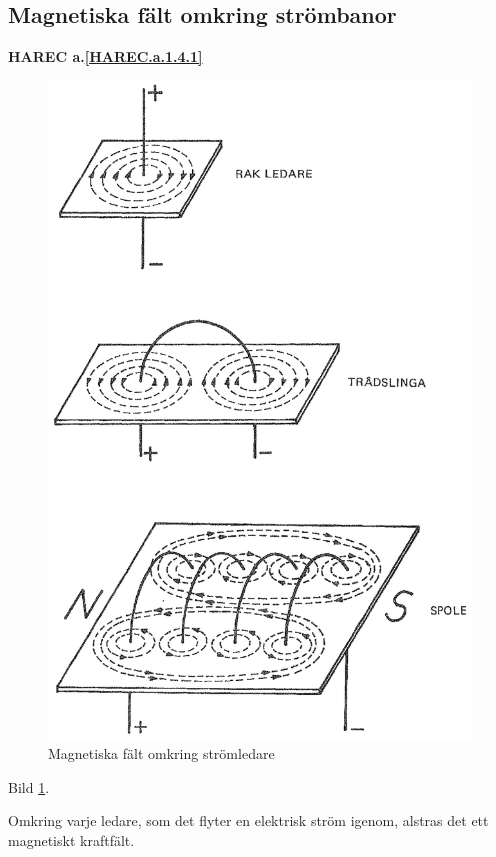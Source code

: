 \subsection{Magnetiska fält omkring strömbanor}
\textbf{HAREC a.\ref{HAREC.a.1.4.1}\label{myHAREC.a.1.4.1}}

\begin{figure}
  \includegraphics[width=\textwidth]{images/cropped_pdfs/bild_2_1-08.pdf}
  \caption{Magnetiska fält omkring strömledare}
  \label{fig:BildII1-8}
\end{figure}

Bild \ref{fig:BildII1-8}.

Omkring varje ledare, som det flyter en elektrisk ström igenom, alstras det ett
magnetiskt kraftfält.

